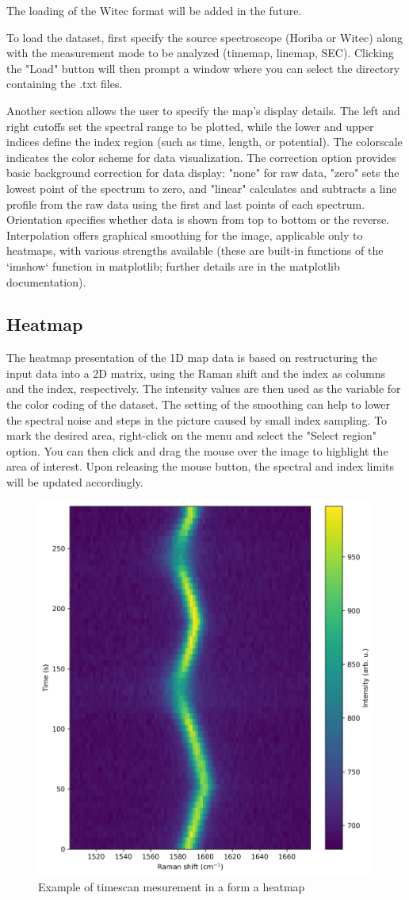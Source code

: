 The loading of the Witec format will be added in the future.

To load the dataset, first specify the source spectroscope (Horiba or Witec) along with the measurement mode to be analyzed (timemap, linemap, SEC). Clicking the "Load" button will then prompt a window where you can select the directory containing the .txt files.

Another section allows the user to specify the map's display details. The left and right cutoffs set the spectral range to be plotted, while the lower and upper indices define the index region (such as time, length, or potential). The colorscale indicates the color scheme for data visualization. The correction option provides basic background correction for data display: "none" for raw data, "zero" sets the lowest point of the spectrum to zero, and "linear" calculates and subtracts a line profile from the raw data using the first and last points of each spectrum. Orientation specifies whether data is shown from top to bottom or the reverse. Interpolation offers graphical smoothing for the image, applicable only to heatmaps, with various strengths available (these are built-in functions of the `imshow` function in matplotlib; further details are in the matplotlib documentation).

\subsection{Heatmap}
The heatmap presentation of the 1D map data is based on restructuring the input data into a 2D matrix, using the Raman shift and the index as columns and the index, respectively. The intensity values are then used as the variable for the color coding of the dataset. The setting of the smoothing can help to lower the spectral noise and steps in the picture caused by small index sampling. To mark the desired area, right-click on the menu and select the "Select region" option. You can then click and drag the mouse over the image to highlight the area of interest. Upon releasing the mouse button, the spectral and index limits will be updated accordingly.

\begin{figure}[H]
    \centering
    \includegraphics[width=0.5\linewidth]{Resources/heatmap_1D.png}
    \caption{Example of timescan mesurement in a form a heatmap}
    \label{heatmap_1D}
\end{figure}

